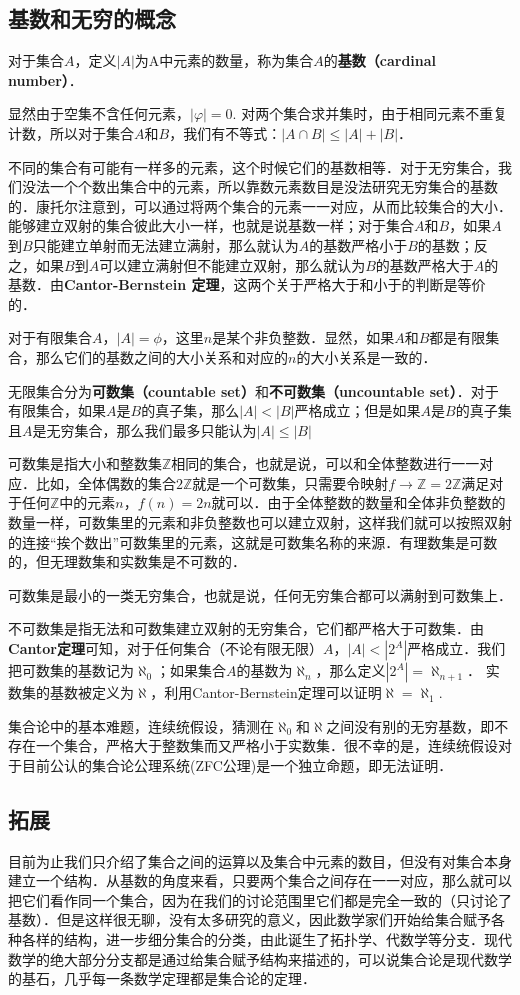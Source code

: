 \subsection{基数和无穷的概念}

对于集合$A$，定义$|A|$为A中元素的数量，称为集合$A$的\textbf{基数（cardinal number）}．

显然由于空集不含任何元素，$|φ|=0$. 对两个集合求并集时，由于相同元素不重复计数，所以对于集合$A$和$B$，我们有不等式：$|A\cap B|\le|A|+|B|$．

不同的集合有可能有一样多的元素，这个时候它们的基数相等．对于无穷集合，我们没法一个个数出集合中的元素，所以靠数元素数目是没法研究无穷集合的基数的．康托尔注意到，可以通过将两个集合的元素一一对应，从而比较集合的大小．能够建立双射的集合彼此大小一样，也就是说基数一样；对于集合$A$和$B$，如果$A$到$B$只能建立单射而无法建立满射，那么就认为$A$的基数严格小于$B$的基数；反之，如果$B$到$A$可以建立满射但不能建立双射，那么就认为$B$的基数严格大于$A$的基数．由\textbf{Cantor-Bernstein 定理}，这两个关于严格大于和小于的判断是等价的．

对于有限集合$A$，$|A|=\phi$，这里$n$是某个非负整数．显然，如果$A$和$B$都是有限集合，那么它们的基数之间的大小关系和对应的$n$的大小关系是一致的．

无限集合分为\textbf{可数集（countable set）}和\textbf{不可数集（uncountable set）}．对于有限集合，如果$A$是$B$的真子集，那么$|A|<|B|$严格成立；但是如果$A$是$B$的真子集且$A$是无穷集合，那么我们最多只能认为$|A|\le|B|$

可数集是指大小和整数集$\mathbb{Z}$相同的集合，也就是说，可以和全体整数进行一一对应．比如，全体偶数的集合$2\mathbb{Z}$就是一个可数集，只需要令映射$f\rightarrow \mathbb{Z}=2\mathbb{Z}$满足对于任何$\mathbb{Z}$中的元素$n$，$f(n)=2n$就可以．由于全体整数的数量和全体非负整数的数量一样，可数集里的元素和非负整数也可以建立双射，这样我们就可以按照双射的连接“挨个数出”可数集里的元素，这就是可数集名称的来源．有理数集是可数的，但无理数集和实数集是不可数的．

可数集是最小的一类无穷集合，也就是说，任何无穷集合都可以满射到可数集上．

不可数集是指无法和可数集建立双射的无穷集合，它们都严格大于可数集．由\textbf{Cantor定理}可知，对于任何集合（不论有限无限）$A$，$|A|<|2^A|$严格成立．我们把可数集的基数记为$\aleph_0$；如果集合$A$的基数为$\aleph_n$，那么定义$|2^A|=\aleph_{n+1}$． 实数集的基数被定义为$\aleph$，利用Cantor-Bernstein定理可以证明$\aleph=\aleph_1$. 

集合论中的基本难题，连续统假设，猜测在$\aleph_0$和$\aleph$之间没有别的无穷基数，即不存在一个集合，严格大于整数集而又严格小于实数集．很不幸的是，连续统假设对于目前公认的集合论公理系统(ZFC公理)是一个独立命题，即无法证明．

\subsection{拓展}

目前为止我们只介绍了集合之间的运算以及集合中元素的数目，但没有对集合本身建立一个结构．从基数的角度来看，只要两个集合之间存在一一对应，那么就可以把它们看作同一个集合，因为在我们的讨论范围里它们都是完全一致的（只讨论了基数）．但是这样很无聊，没有太多研究的意义，因此数学家们开始给集合赋予各种各样的结构，进一步细分集合的分类，由此诞生了拓扑学、代数学等分支．现代数学的绝大部分分支都是通过给集合赋予结构来描述的，可以说集合论是现代数学的基石，几乎每一条数学定理都是集合论的定理．